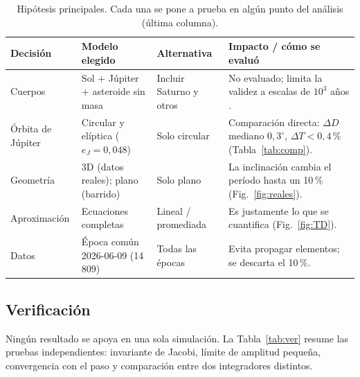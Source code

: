 \documentclass[11pt, a4paper]{article}
\begin{document}
\begin{table}[t]
\centering\small
\caption{Hipótesis principales. Cada una se pone a prueba en algún punto del análisis (última columna).}
\label{tab:hip}
\begin{tabular}{>{\raggedright}p{2.6cm}>{\raggedright}p{3.6cm}>{\raggedright}p{3.6cm}>{\raggedright\arraybackslash}p{5.2cm}}
\toprule
Decisión & Modelo elegido & Alternativa & Impacto / cómo se evaluó\\\midrule
Cuerpos & Sol + Júpiter + asteroide sin masa & Incluir Saturno y otros & No evaluado; limita la validez a escalas de $10^3$ años \cite{robutel}.\\
Órbita de Júpiter & Circular y elíptica ($e_J=0{,}048$) & Solo circular & Comparación directa: $\Delta D$ mediano $0{,}3^\circ$, $\Delta T<0{,}4\,\%$ (Tabla~\ref{tab:comp}).\\
Geometría & 3D (datos reales); plano (barrido) & Solo plano & La inclinación cambia el período hasta un 10\,\% (Fig.~\ref{fig:reales}).\\
Aproximación & Ecuaciones completas & Lineal / promediada & Es justamente lo que se cuantifica (Fig.~\ref{fig:TD}).\\
Datos & Época común 2026-06-09 (14\,809) & Todas las épocas & Evita propagar elementos; se descarta el 10\,\%.\\
\bottomrule
\end{tabular}
\end{table}

\subsection{Verificación}
Ningún resultado se apoya en una sola simulación. La Tabla~\ref{tab:ver} resume las pruebas independientes: invariante de Jacobi, límite de amplitud pequeña, convergencia con el paso y comparación entre dos integradores distintos.
\end{document}
